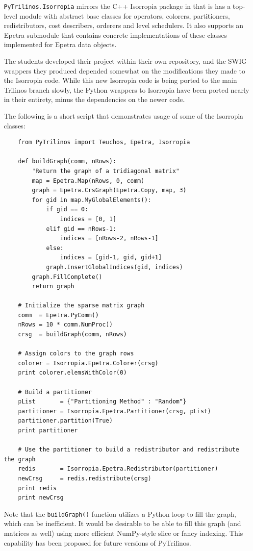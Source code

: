 \documentclass[11pt]{article}
\begin{document}
{\tt PyTrilinos.Isorropia} mirrors the C++ Isorropia package in that is has a top-level module with abstract base classes for operators, colorers, partitioners, redistributors, cost describers, orderers and level schedulers.  It also supports an Epetra submodule that contains concrete implementations of these classes implemented for Epetra data objects.

The students developed their project within their own repository, and the SWIG wrappers they produced depended somewhat on the modifications they made to the Isorropia code.  While this new Isorropia code is being ported to the main Trilinos branch slowly, the Python wrappers to Isorropia have been ported nearly in their entirety, minus the dependencies on the newer code.

The following is a short script that demonstrates usage of some of the Isorropia classes:
\begin{verbatim}
    from PyTrilinos import Teuchos, Epetra, Isorropia
    
    def buildGraph(comm, nRows):
        "Return the graph of a tridiagonal matrix"
        map = Epetra.Map(nRows, 0, comm)
        graph = Epetra.CrsGraph(Epetra.Copy, map, 3)
        for gid in map.MyGlobalElements():
            if gid == 0:
                indices = [0, 1]
            elif gid == nRows-1:
                indices = [nRows-2, nRows-1]
            else:
                indices = [gid-1, gid, gid+1]
            graph.InsertGlobalIndices(gid, indices)
        graph.FillComplete()
        return graph

    # Initialize the sparse matrix graph
    comm  = Epetra.PyComm()
    nRows = 10 * comm.NumProc()
    crsg  = buildGraph(comm, nRows)

    # Assign colors to the graph rows
    colorer = Isorropia.Epetra.Colorer(crsg)
    print colorer.elemsWithColor(0)

    # Build a partitioner
    pList       = {"Partitioning Method" : "Random"}
    partitioner = Isorropia.Epetra.Partitioner(crsg, pList)
    partitioner.partition(True)
    print partitioner

    # Use the partitioner to build a redistributor and redistribute the graph
    redis       = Isorropia.Epetra.Redistributor(partitioner)
    newCrsg     = redis.redistribute(crsg)
    print redis
    print newCrsg
\end{verbatim}

Note that the {\tt buildGraph()} function utilizes a Python loop to fill the graph, which can be inefficient.  It would be desirable to be able to fill this graph (and matrices as well) using more efficient NumPy-style slice or fancy indexing.  This capability has been proposed for future versions of PyTrilinos.
\end{document}
